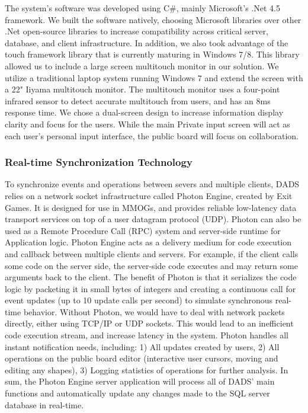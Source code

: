 \documentclass{sigchi}
\begin{document}
The system's software was developed using C\#, mainly Microsoft's .Net 4.5  framework. We built the software natively, choosing Microsoft libraries over other .Net open-source libraries to increase compatibility across critical server, database, and client infrastructure. In addition, we also took advantage of the touch framework library that is currently maturing in Windows 7/8. This library allowed us to include a large screen multitouch monitor in our solution. We utilize a traditional laptop system running Windows 7 and extend the screen with a 22" Iiyama multitouch monitor. The multitouch monitor uses a four-point infrared sensor to detect accurate multitouch from users, and has an 8ms response time. We chose a dual-screen design to increase information display clarity and focus for the users. While the main Private input screen will act as each user's personal input interface,  the public board will focus on collaboration. 

\subsubsection{Real-time Synchronization Technology}

To synchronize events and operations between severs and multiple clients, DADS relies on a network
socket infrastructure called Photon Engine, created by Exit Games. It is designed for use in MMOGs, and provides reliable low-latency data transport services on top of a user datagram protocol (UDP). Photon can also be used as a Remote Procedure Call (RPC) system and server-side runtime for Application logic. Photon Engine acts as a delivery medium for code execution and callback between multiple clients and servers. For example, if the client calls some code on the server side, the server-side code executes and may return some arguments back to the client. The benefit of Photon is that it serializes the code logic by packeting it in small bytes of integers and creating a continuous call for event updates (up to 10 update calls per second) to simulate synchronous real-time behavior. Without Photon, we would have to deal with network packets directly, either using TCP/IP or UDP sockets. This would lead to an inefficient code execution stream, and increase latency in the system. Photon handles all instant notification needs, including: 1) All updates created by users, 2) All operations on the public board editor (interactive user cursors, moving and editing any shapes), 3) Logging statistics of operations for further analysis. In sum, the Photon Engine server application will process all of DADS' main functions and automatically update any changes made to the SQL server database in real-time.
\end{document}
